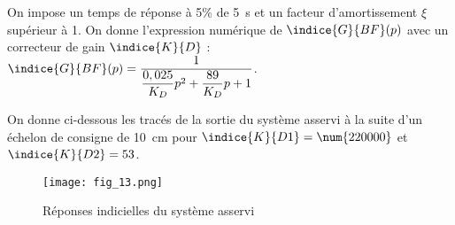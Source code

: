  On impose un temps de réponse à 5\% de \SI{5}{s} et un facteur d’amortissement $\xi$ supérieur à 1.
 On donne l’expression numérique de $\indice{G}{BF}(p)$ avec un correcteur de gain $\indice{K}{D}$ :
 $\indice{G}{BF}(p)=\dfrac{1}{\dfrac{0,025}{K_D}p^2+\dfrac{89}{K_D}p +1}$.
 
 


 On donne ci-dessous les tracés de la sortie du système asservi à la suite d’un échelon de consigne de 
\SI{10}{cm} pour $\indice{K}{D1} = \num{220000}$ et $\indice{K}{D2} = 53$.


\begin{figure}[!h]
\centering
\texttt{[image: fig\_13.png]}
\caption{Réponses indicielles du système asservi \label{fig_13}}
\end{figure}

